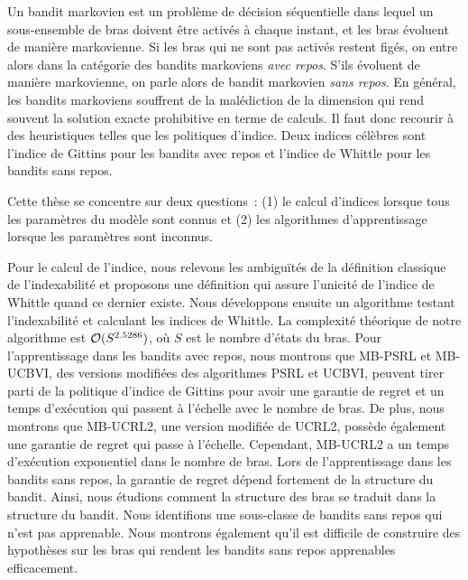 Un bandit markovien est un problème de décision séquentielle dans lequel un sous-ensemble de bras doivent être activés à chaque instant, et les bras évoluent de manière markovienne.
Si les bras qui ne sont pas activés restent figés, on entre alors dans la catégorie des bandits markoviens \emph{avec repos}.
S'ils évoluent de manière markovienne, on parle alors de bandit markovien \emph{sans repos}.
En général, les bandits markoviens souffrent de la malédiction de la dimension qui rend souvent la solution exacte prohibitive en terme de calculs.
Il faut donc recourir à des heuristiques telles que les politiques d'indice.
Deux indices célèbres sont l'indice de Gittins pour les bandits avec repos et l'indice de Whittle pour les bandits sans repos.

Cette thèse se concentre sur deux questions : (1) le calcul d'indices lorsque tous les paramètres du modèle sont connus et (2) les algorithmes d'apprentissage lorsque les paramètres sont inconnus.

Pour le calcul de l'indice, nous relevons les ambiguïtés de la définition classique de l'indexabilité et proposons une définition qui assure l'unicité de l'indice de Whittle quand ce dernier existe.
Nous développons ensuite un algorithme testant l'indexabilité et calculant les indices de Whittle.
La complexité théorique de notre algorithme est $\mathcal{O}(S^{2.5286})$, où $S$ est le nombre d'états du bras.
Pour l'apprentissage dans les bandits avec repos, nous montrons que MB-PSRL et MB-UCBVI, des versions modifiées des algorithmes PSRL et UCBVI, peuvent tirer parti de la politique d'indice de Gittins pour avoir une garantie de regret et un temps d'exécution qui passent à l'échelle avec le nombre de bras.
De plus, nous montrons que MB-UCRL2, une version modifiée de UCRL2, possède également une garantie de regret qui passe à l'échelle.
Cependant, MB-UCRL2 a un temps d'exécution exponentiel dans le nombre de bras.
Lors de l'apprentissage dans les bandits sans repos, la garantie de regret dépend fortement de la structure du bandit. Ainsi, nous étudions comment la structure des bras se traduit dans la structure du bandit.
Nous identifions une sous-classe de bandits sans repos qui n'est pas apprenable.
Nous montrons également qu'il est difficile de construire des hypothèses sur les bras qui rendent les bandits sans repos apprenables efficacement.
